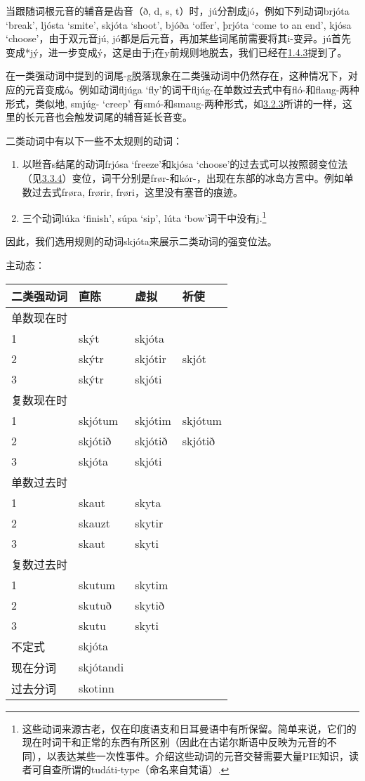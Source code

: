 当跟随词根元音的辅音是齿音（ð, d, s,
t）时，jú分割成jó，例如下列动词brjóta `break‌', ljósta `smite‌', skjóta
`shoot‌', bjóða `offer‌', þrjóta `come to an end‌', kjósa
`choose‌'，由于双元音jú,
jó都是后元音，再加某些词尾前需要将其i-变异。jú首先变成*jý，进一步变成ý，这是由于j在y前规则地脱去，我们已经在\hyperref[ux534aux5143ux97f3ux7684ux4fddux6301ux6027]{1.4.3}提到了。

在一类强动词中提到的词尾-g脱落现象在二类强动词中仍然存在，这种情况下，对应的元音变成ó。例如动词fljúga
`fly‌'的词干fljúg-在单数过去式中有fló-和flaug-两种形式，类似地, smjúg-
`creep‌'
有smó-和smaug-两种形式，如\hyperref[ux7b2cux4e00ux5f3aux53d8ux4f4dux6cd5]{3.2.3}所讲的一样，这里的长元音也会触发词尾的辅音延长音变。

二类动词中有以下一些不太规则的动词：

\begin{enumerate}
\def\labelenumi{\arabic{enumi})}
\item
  以咝音s结尾的动词frjósa `freeze‌'和kjósa
  `choose‌'的过去式可以按照弱变位法（见\hyperref[ux7b2cux4e8cux5f31ux53d8ux4f4dux6cd5]{3.3.4}）变位，词干分别是frør-和kór-，出现在东部的冰岛方言中。例如单数过去式frøra,
  frørir, frøri，这里没有塞音的痕迹。
\item
  三个动词lúka `finish‌', súpa `sip‌', lúta `bow‌'词干中没有j.\footnote{这些动词来源古老，仅在印度语支和日耳曼语中有所保留。简单来说，它们的现在时词干和正常的东西有所区别（因此在古诺尔斯语中反映为元音的不同），以表达某些一次性事件。介绍这些动词的元音交替需要大量PIE知识，读者可自查所谓的tudáti-type（命名来自梵语）.}
\end{enumerate}

因此，我们选用规则的动词skjóta来展示二类动词的强变位法。

主动态：

\begin{longtable}{llll}
\toprule
二类强动词 & 直陈 & 虚拟 & 祈使 \\
\midrule
\endhead
\bottomrule
\endfoot
单数现在时 & & & \\
1 & skýt & skjóta & \\
2 & skýtr & skjótir & skjót \\
3 & skýtr & skjóti & \\
复数现在时 & & & \\
1 & skjótum & skjótim & skjótum \\
2 & skjótið & skjótið & skjótið \\
3 & skjóta & skjóti & \\
单数过去时 & & & \\
1 & skaut & skyta & \\
2 & skauzt & skytir & \\
3 & skaut & skyti & \\
复数过去时 & & & \\
1 & skutum & skytim & \\
2 & skutuð & skytið & \\
3 & skutu & skyti & \\
不定式 & skjóta & & \\
现在分词 & skjótandi & & \\
过去分词 & skotinn & & \\
\end{longtable}

